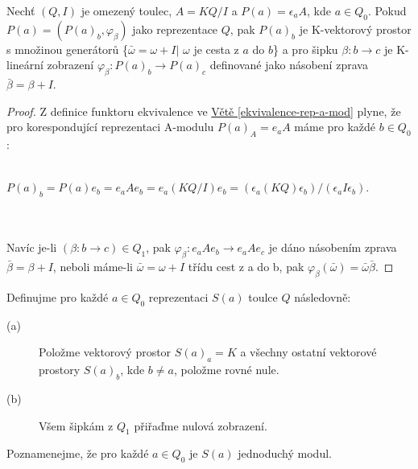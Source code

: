     \begin{thm}\label{lem-proj-prezentace}
      Nechť $(Q,I)$ je omezený toulec, $A=KQ/I$ a $P(a)=\epsilon_a A$, kde $a\in 
      Q_0$. Pokud $P(a)=(P(a)_b,\varphi_\beta)$ jako reprezentace $Q$, pak $P(a)_b$ je K-vektorový 
        prostor s množinou generátorů \{$\bar{\omega}=\omega+I|$ $\omega$ je 
        cesta z $a$ do $b$\} a pro šipku $\beta:b\rightarrow c$ je K-lineární 
        zobrazení $\varphi_\beta:P(a)_b\rightarrow P(a)_c$ definované jako 
        násobení zprava $\bar{\beta}=\beta+I$.
    \end{thm}
    
    \begin{proof}
      Z definice funktoru ekvivalence ve
      \hyperref[ekvivalence-rep-a-mod]{Větě \ref*{ekvivalence-rep-a-mod}} plyne, 
      že pro korespondující reprezentaci A-modulu $P(a)_A=e_aA$ máme pro každé $b\in 
      Q_0$:\\\\
      \centerline{$
        P(a)_b=P(a)e_b=e_aAe_b=e_a(KQ/I)e_b=(\epsilon_a(KQ)\epsilon_b)/(\epsilon_a I \epsilon_b)
      $.}\\\\
      Navíc je-li $(\beta:b\rightarrow c)\in Q_1$, pak $\varphi_\beta:e_aAe_b\rightarrow e_aAe_c$ 
      je dáno násobením zprava $\bar{\beta}=\beta+I$, neboli máme-li $\bar{\omega}=\omega+I$ 
      třídu cest z a do b, pak 
      $\varphi_\beta(\bar{\omega})=\bar{\omega}\bar{\beta}$.
    \end{proof}
    
    \begin{dfn}
      Definujme pro každé $a\in Q_0$ reprezentaci $S(a)$ toulce $Q$ následovně:
      \begin{description}
        \item[(a)] Položme vektorový prostor $S(a)_a=K$ a všechny ostatní vektorové 
        prostory $S(a)_b$, kde $b\neq a$, položme rovné nule.
        \item[(b)] Všem šipkám z $Q_1$ přiřaďme nulová zobrazení.
      \end{description} 
    \end{dfn}
    
    \begin{pzn}
      Poznamenejme, že pro každé $a\in Q_0$ je $S(a)$ jednoduchý modul.
    \end{pzn}